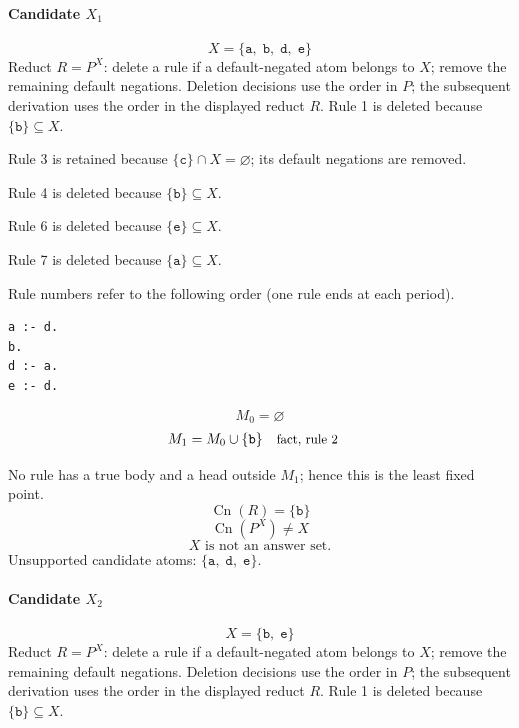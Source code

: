 \documentclass[a4paper,11pt]{article}
\newif\ifexplain
\newcommand{\explain}[1]{\ifexplain\begin{erklbox}#1\end{erklbox}\fi}
\newcommand{\why}[1]{\text{\small #1}}
\newcommand{\at}[1]{\texttt{#1}}
\begin{document}
\paragraph{Candidate $X_1$}
\[
X=\{\at{a},\;\at{b},\;\at{d},\;\at{e}\}
\]
Reduct $R=P^X$: delete a rule if a default-negated atom belongs to $X$; remove the remaining default negations. Deletion decisions use the order in $P$; the subsequent derivation uses the order in the displayed reduct $R$.
Rule 1 is deleted because $\{\at{b}\}\subseteq X$.

Rule 3 is retained because $\{\at{c}\}\cap X=\varnothing$; its default negations are removed.

Rule 4 is deleted because $\{\at{b}\}\subseteq X$.

Rule 6 is deleted because $\{\at{e}\}\subseteq X$.

Rule 7 is deleted because $\{\at{a}\}\subseteq X$.

Rule numbers refer to the following order (one rule ends at each period).
\begin{small}
\begin{verbatim}
a :- d.
b.
d :- a.
e :- d.
\end{verbatim}
\end{small}
\explain{Beim Redukt bleibt die Kandidatenmenge fest. Wir entscheiden zuerst, welche Regeln wegfallen. Erst danach berechnen wir aus den verbleibenden positiven Regeln die kleinste abgeschlossene Menge. Ein Modell allein reicht nicht: Diese Menge muss genau der Kandidat sein.}
\[
M_0=\varnothing
\]
\begin{align*}
M_{1} &= M_{0}\cup \{\at{b}\} && \why{fact, rule 2}
\end{align*}
\explain{Diese Regel hat keinen Körper. Ihr Kopf $\at{b}$ ist damit ein Fakt und muss in die Menge.}
No rule has a true body and a head outside $M_{1}$; hence this is the least fixed point.
\[
\operatorname{Cn}(R)=\{\at{b}\}
\]
\[
\operatorname{Cn}(P^X)\ne X
\]
\[
\boxed{X\text{ is not an answer set.}}
\]
Unsupported candidate atoms: $\{\at{a},\;\at{d},\;\at{e}\}$.
\paragraph{Candidate $X_2$}
\[
X=\{\at{b},\;\at{e}\}
\]
Reduct $R=P^X$: delete a rule if a default-negated atom belongs to $X$; remove the remaining default negations. Deletion decisions use the order in $P$; the subsequent derivation uses the order in the displayed reduct $R$.
Rule 1 is deleted because $\{\at{b}\}\subseteq X$.
\end{document}
